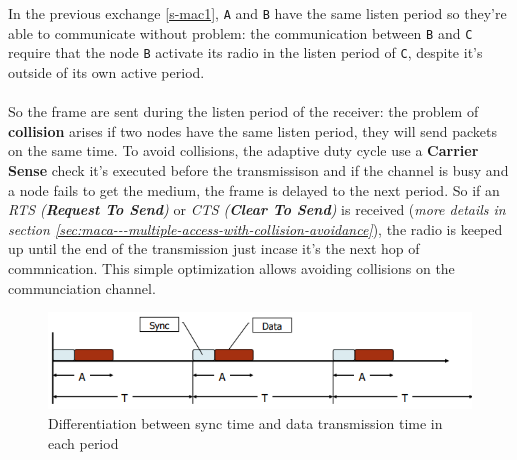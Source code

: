 \documentclass[10pt,a4paper]{report}
\theoremstyle{definition}
\begin{document}
In the previous exchange \ref{s-mac1}, \texttt{A} and \texttt{B} have the same listen period so they're able to communicate without problem: the communication between \texttt{B} and \texttt{C} require that the node \texttt{B} activate its radio in the listen period of \texttt{C}, despite it's outside of its own active period.\\\\
So the frame are sent during the listen period of the receiver: the problem of \textbf{collision} arises if two nodes have the same listen period, they will send packets on the same time.  To avoid collisions, the adaptive duty cycle use a \textbf{Carrier Sense} check it's executed before the transmissison and if the channel is busy and a node fails to get the medium, the frame is delayed to the next period. So if an \textit{RTS (\textbf{Request To Send})} or \textit{CTS (\textbf{Clear To Send})} is received (\textit{more details in section \ref{sec:maca---multiple-access-with-collision-avoidance}}), the radio is keeped up until the end of the transmission just incase it's the next hop of commnication. This simple optimization allows avoiding collisions on the communciation channel.
\begin{figure}[h]
	\centering\includegraphics[scale=0.50]{images/Pasted image 20230404171802.png}	\caption{Differentiation between sync time and data transmission time in each period}
\end{figure}
\end{document}
